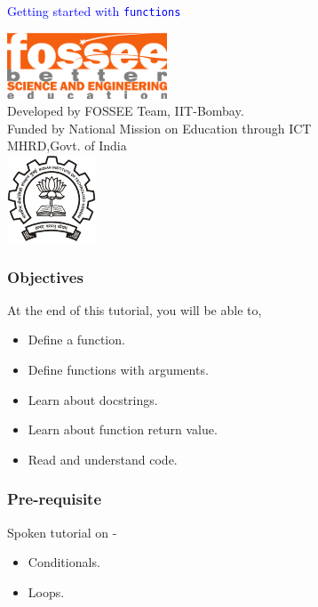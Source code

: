 \documentclass[presentation]{beamer}
\title{}
\author{FOSSEE}
\date{}
\begin{document}
\begin{frame}

\begin{center}
\vspace{12pt}
\textcolor{blue}{\huge Getting started with \texttt{functions}}
\end{center}
\vspace{18pt}
\begin{center}
\vspace{10pt}
\includegraphics[scale=0.95]{../images/fossee-logo.png}\\
\vspace{5pt}
\scriptsize Developed by FOSSEE Team, IIT-Bombay. \\ 
\scriptsize Funded by National Mission on Education through ICT\\
\scriptsize  MHRD,Govt. of India\\
\includegraphics[scale=0.30]{../images/iitb-logo.png}\\
\end{center}
\end{frame}
\begin{frame}
\frametitle{Objectives}
\label{sec-2}

  At the end of this tutorial, you will be able to, 


\begin{itemize}
\item Define a function.
\item Define functions with arguments.
\item Learn about docstrings.
\item Learn about function return value.
\item Read and understand code.
\end{itemize}
\end{frame}
\begin{frame}
\frametitle{Pre-requisite}
\label{sec-3}

Spoken tutorial on -

\begin{itemize}
\item Conditionals.
\item Loops.
\end{itemize}
\end{frame}
\end{document}
